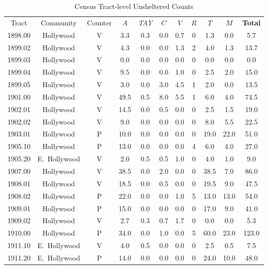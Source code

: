 \documentclass[11pt,twocolumn]{article}
\begin{document}
\begin{table}[]
\caption{Census Tract-level Unsheltered Counts}
\centering
\begin{tabular}{ccccccccccc}
\toprule
Tract & Community & Counter & $A$ & {\it TAY} & $C$ & $V$ & $R$ & $T$ & $M$ & {\bf Total} \\ \cmidrule{1-11}
1898.00 & Hollywood & V &  3.3 &  0.3 &  0.0 &  0.7 & 0 &  1.3 &  0.0 &   5.7 \\
1899.02 & Hollywood & V &  4.3 &  0.0 &  0.0 &  1.3 & 2 &  4.0 &  1.3 &  13.7 \\
1899.03 & Hollywood & V &  0.0 &  0.0 &  0.0 &  0.0 & 0 &  0.0 &  0.0 &   0.0 \\
1899.04 & Hollywood & V &  9.5 &  0.0 &  0.0 &  1.0 & 0 &  2.5 &  2.0 &  15.0 \\
1899.05 & Hollywood & V &  3.0 &  0.0 &  3.0 &  4.5 & 1 &  2.0 &  0.0 &  13.5 \\
1901.00 & Hollywood & V & 49.5 &  0.5 &  8.0 &  5.5 & 1 &  6.0 &  4.0 &  74.5 \\
1902.01 & Hollywood & V & 14.5 &  0.0 &  0.5 &  0.0 & 0 &  2.5 &  1.5 &  19.0 \\
1902.02 & Hollywood & V &  9.0 &  0.0 &  0.0 &  0.0 & 0 &  8.0 &  5.5 &  22.5 \\
1903.01 & Hollywood & P & 10.0 &  0.0 &  0.0 &  0.0 & 0 & 19.0 & 22.0 &  51.0 \\
1905.10 & Hollywood & P & 13.0 &  0.0 &  0.0 &  0.0 & 4 &  6.0 &  4.0 &  27.0 \\
1905.20 & E.~Hollywood & V &  2.0 &  0.5 &  0.5 &  1.0 & 0 &  4.0 &  1.0 &   9.0 \\
1907.00 & Hollywood & V & 38.5 &  0.0 &  2.0 &  0.0 & 0 & 38.5 &  7.0 &  86.0 \\
1908.01 & Hollywood & V & 18.5 &  0.0 &  0.5 &  0.0 & 0 & 19.5 &  9.0 &  47.5 \\
1908.02 & Hollywood & P & 22.0 &  0.0 &  0.0 &  1.0 & 5 & 13.0 & 13.0 &  54.0 \\
1909.01 & Hollywood & P & 15.0 &  0.0 &  0.0 &  0.0 & 0 & 17.0 &  9.0 &  41.0 \\
1909.02 & Hollywood & V &  2.7 &  0.3 &  0.7 &  1.7 & 0 &  0.0 &  0.0 &   5.3 \\
1910.00 & Hollywood & P & 34.0 &  0.0 &  1.0 &  0.0 & 5 & 60.0 & 23.0 & 123.0 \\
1911.10 & E.~Hollywood & V &  4.0 &  0.5 &  0.0 &  0.0 & 0 &  2.5 &  0.5 &   7.5 \\
1911.20 & E.~Hollywood & P & 14.0 &  0.0 &  0.0 &  0.0 & 0 & 24.0 & 10.0 &  48.0 \\

\end{tabular}
\end{table}
\end{document}
